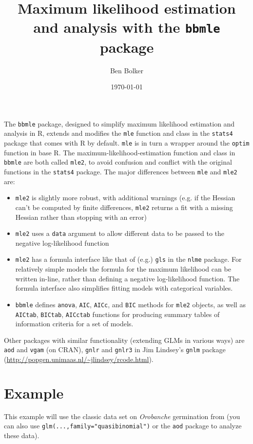 \documentclass{article}
\author{Ben Bolker}
\title{Maximum likelihood estimation and analysis
  with the {\tt bbmle} package}
\date{\today}
\newcommand{\code}[1]{{\tt #1}}
\begin{document}

\maketitle


The \code{bbmle} package, designed to simplify
maximum likelihood estimation and analysis in R,
extends and modifies the \code{mle} function and class
in the \code{stats4} package that comes with R by default.
\code{mle} is in turn a wrapper around the \code{optim}
function in base R.
The maximum-likelihood-estimation function and class
in \code{bbmle} are both called \code{mle2}, to avoid
confusion and conflict with the original functions in
the \code{stats4} package.  The major differences between
\code{mle} and \code{mle2} are:
\begin{itemize}
\item \code{mle2} is slightly
   more robust, with additional warnings (e.g.
  if the Hessian can't be computed by finite differences,
  \code{mle2} returns a fit with a missing Hessian rather
  than stopping with an error)
\item \code{mle2} uses a \code{data} argument to allow different
  data to be passed to the negative log-likelihood function
\item \code{mle2} has a formula interface like that
 of (e.g.) \code{gls} in the \code{nlme} package.
  For relatively simple models the formula for the
  maximum likelihood can be written in-line, rather than
  defining a negative log-likelihood function.  The formula
  interface also simplifies fitting models with
  categorical variables.  
\item \code{bbmle} defines \code{anova}, \code{AIC}, \code{AICc}, 
  and \code{BIC} methods for
  \code{mle2} objects, as well as
  \code{AICtab}, \code{BICtab}, \code{AICctab}
  functions for producing summary tables of information criteria for a 
  set of models.
\end{itemize}

Other packages with similar functionality (extending
GLMs in various ways) are \code{aod} and \code{vgam} (on CRAN), 
\code{gnlr} and \code{gnlr3} in Jim Lindsey's \code{gnlm} package
(\url{http://popgen.unimaas.nl/~jlindsey/rcode.html}).

\section{Example}

This example will use the classic data set on
\emph{Orobanche} germination from \cite{Crowder1978}
(you can also use
\code{glm(...,family="quasibinomial")} or
the \code{aod} package to analyze these data).
\end{document}

